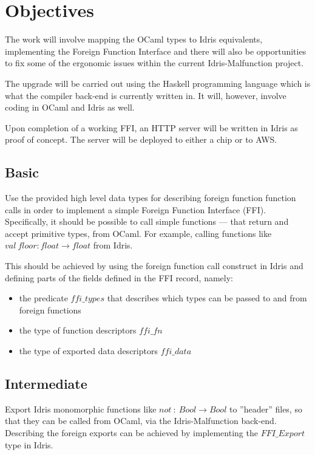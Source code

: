 \documentclass[a4paper]{report}
\begin{document}



\section{Objectives}

The work will involve mapping the OCaml types to Idris equivalents,
implementing the Foreign Function Interface and there will also be
opportunities to fix some of the ergonomic issues within the current
Idris-Malfunction project.

The upgrade will be carried out using the Haskell programming language which is
what the compiler back-end is currently written in.
It will, however, involve coding in OCaml and Idris as well.

Upon completion of a working FFI, an HTTP server will be written in Idris as
proof of concept.
The server will be deployed to either a chip or to AWS.

\subsection{Basic}
Use the provided high level data types for describing foreign function
function calls in order to implement a simple Foreign Function Interface (FFI).
Specifically, it should be possible to call simple
functions --- that return
and accept primitive types, from OCaml.
For example, calling functions like
$val \ floor : float \rightarrow float$ from Idris.

This should be achieved by using the foreign function call construct in Idris
and defining parts of the fields defined in the FFI record, namely:
\begin{itemize}
	\item the predicate $ffi\_types$ that describes which types can be
	      passed to and from foreign functions
	\item the type of function descriptors $ffi\_fn$
	\item the type of exported data descriptors $ffi\_data$
\end{itemize}

\subsection{Intermediate}
Export Idris monomorphic functions like
$not \ : \ Bool \rightarrow Bool$ to ''header'' files, so that they can be
called from OCaml, via the Idris-Malfunction back-end.
Describing the foreign exports can be achieved by implementing the
$FFI\_Export$ type in Idris.
\end{document}
